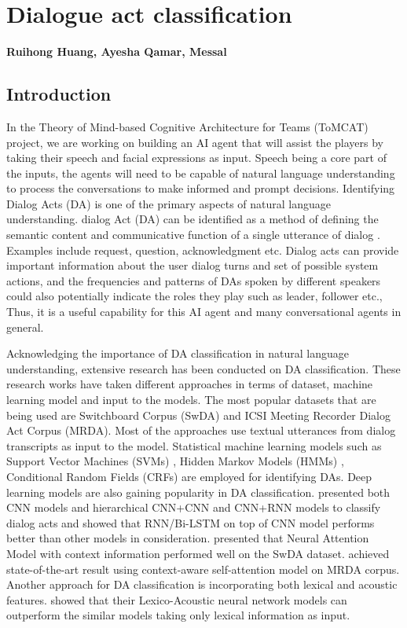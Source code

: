 \chapter{Dialogue act classification}
\label{ch:da_classification}
\textbf{Ruihong Huang, Ayesha Qamar, Messal}

\section{Introduction}

In the Theory of Mind-based Cognitive Architecture for Teams (ToMCAT) project,
we are working on building an AI agent that will assist the players by taking
their speech and facial expressions as input. Speech being a core part of the
inputs, the agents will need to be capable of natural language understanding to
process the conversations to make informed and prompt decisions. Identifying
Dialog Acts (DA) is one of the primary aspects of natural language
understanding. dialog Act (DA) can be identified as a method of defining the
semantic content and communicative function of a single utterance of dialog
\citep{Searle:1969}. Examples include request, question, acknowledgment etc.
Dialog acts can provide important information about the user dialog turns and
set of possible system actions, and the frequencies and patterns of DAs spoken
by different speakers could also potentially indicate the roles they play such
as leader, follower etc., Thus, it is a useful capability for this AI agent and
many conversational agents in general.

Acknowledging the importance of DA classification in natural language
understanding, extensive research has been conducted on DA classification.
These research works have taken different approaches in terms of dataset,
machine learning model and input to the models. The most popular datasets that
are being used are Switchboard Corpus (SwDA) and ICSI Meeting Recorder Dialog
Act Corpus (MRDA). Most of the approaches use textual utterances from dialog
transcripts as input to the model. Statistical machine learning models such as
Support Vector Machines (SVMs) \citep{Henderson.ea:2012}, Hidden Markov Models
(HMMs) \citep{Stolcke.ea:2000}, Conditional Random Fields (CRFs)
\citep{Zimmermann:2009} are employed for identifying DAs. Deep learning models
are also gaining popularity in DA classification. \citet{Liu.ea:2017} presented
both CNN models and hierarchical CNN+CNN and CNN+RNN models to classify dialog
acts and showed that RNN/Bi-LSTM on top of CNN model performs better than other
models in consideration. \citet{Shen.ea:2016} presented that Neural Attention
Model with context information performed well on the SwDA dataset.
\citet{Raheja.ea:2019} achieved state-of-the-art result using context-aware
self-attention model on MRDA corpus. Another approach for DA classification is
incorporating both lexical and acoustic features. \citet{Ortega.ea:2018} showed
that their Lexico-Acoustic neural network models can outperform the similar
models taking only lexical information as input.

